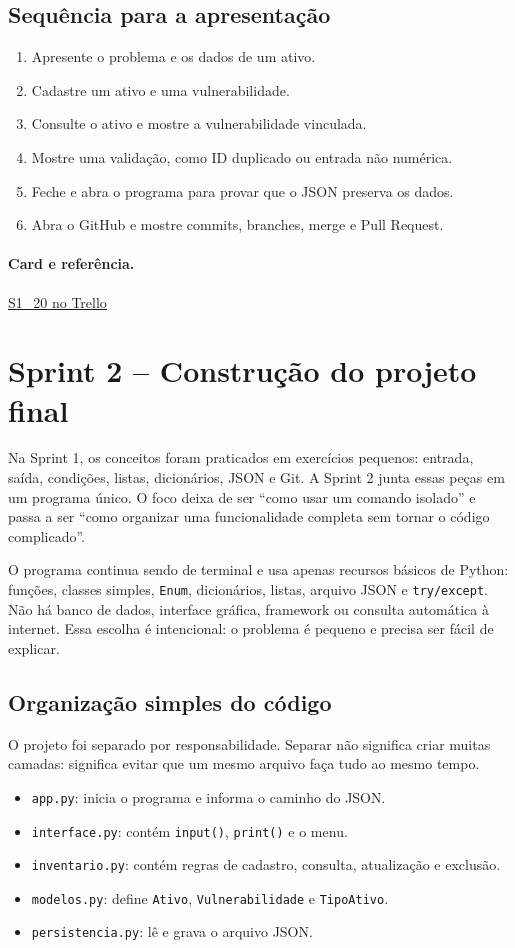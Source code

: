 \documentclass[11pt,a4paper]{article}
\newcommand{\referencia}[2]{\paragraph{Card e referência.}\href{#1}{#2}}
\newcommand{\cardsection}[1]{\Needspace{12\baselineskip}\subsection{#1}}
\begin{document}
\cardsection{Sequência para a apresentação}
\begin{enumerate}
  \item Apresente o problema e os dados de um ativo.
  \item Cadastre um ativo e uma vulnerabilidade.
  \item Consulte o ativo e mostre a vulnerabilidade vinculada.
  \item Mostre uma validação, como ID duplicado ou entrada não numérica.
  \item Feche e abra o programa para provar que o JSON preserva os dados.
  \item Abra o GitHub e mostre commits, branches, merge e Pull Request.
\end{enumerate}

\referencia{https://trello.com/c/X3LzSoi0}{S1\_20 no Trello}

\clearpage
\section{Sprint 2 -- Construção do projeto final}

Na Sprint 1, os conceitos foram praticados em exercícios pequenos: entrada, saída, condições, listas, dicionários, JSON e Git. A Sprint 2 junta essas peças em um programa único. O foco deixa de ser ``como usar um comando isolado'' e passa a ser ``como organizar uma funcionalidade completa sem tornar o código complicado''.

O programa continua sendo de terminal e usa apenas recursos básicos de Python: funções, classes simples, \texttt{Enum}, dicionários, listas, arquivo JSON e \texttt{try/except}. Não há banco de dados, interface gráfica, framework ou consulta automática à internet. Essa escolha é intencional: o problema é pequeno e precisa ser fácil de explicar.

\cardsection{Organização simples do código}

O projeto foi separado por responsabilidade. Separar não significa criar muitas camadas: significa evitar que um mesmo arquivo faça tudo ao mesmo tempo.

\begin{itemize}
  \item \texttt{app.py}: inicia o programa e informa o caminho do JSON.
  \item \texttt{interface.py}: contém \texttt{input()}, \texttt{print()} e o menu.
  \item \texttt{inventario.py}: contém regras de cadastro, consulta, atualização e exclusão.
  \item \texttt{modelos.py}: define \texttt{Ativo}, \texttt{Vulnerabilidade} e \texttt{TipoAtivo}.
  \item \texttt{persistencia.py}: lê e grava o arquivo JSON.
\end{itemize}
\end{document}
